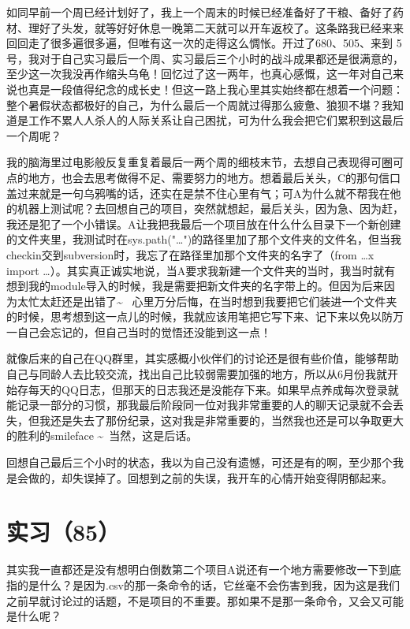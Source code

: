\documentclass[12pt]{book}
\begin{document}
如同早前一个周已经计划好了，我上一个周末的时候已经准备好了干粮、备好了药材、理好了头发，就等好好休息一晚第二天就可以开车返校了。这条路我已经来来回回走了很多遍很多遍，但唯有这一次的走得这么惆怅。开过了680、505、来到 5 号，我对于自己实习最后一个周、实习最后三个小时的战斗成果都还是很满意的，至少这一次我没再作缩头乌龟！回忆过了这一两年，也真心感慨，这一年对自己来说也真是一段值得纪念的成长史！但这一路上我心里其实始终都在想着一个问题：整个暑假状态都极好的自己，为什么最后一个周就过得那么疲惫、狼狈不堪？我知道是工作不累人人杀人的人际关系让自己困扰，可为什么我会把它们累积到这最后一个周呢？

我的脑海里过电影般反复重复着最后一两个周的细枝末节，去想自己表现得可圈可点的地方，也会去思考做得不足、需要努力的地方。想着最后关头，C的那句信口盖过来就是一句乌鸦嘴的话，还实在是禁不住心里有气；可A为什么就不帮我在他的机器上测试呢？去回想自己的项目，突然就想起，最后关头，因为急、因为赶，我还是犯了一个小错误。A让我把我最后一个项目放在什么什么目录下一个新创建的文件夹里，我测试时在sys.path("…")的路径里加了那个文件夹的文件名，但当我checkin交到subversion时，我忘了在路径里加那个文件夹的名字了（from …x import …）。其实真正诚实地说，当A要求我新建一个文件夹的当时，我当时就有想到我的module导入的时候，我是需要把新文件夹的名字带上的。但因为后来因为太忙太赶还是出错了\textasciitilde{}~ 心里万分后悔，在当时想到我要把它们装进一个文件夹的时候，思考想到这一点儿的时候，我就应该用笔把它写下来、记下来以免以防万一自己会忘记的，但自己当时的觉悟还没能到这一点！

就像后来的自己在QQ群里，其实感概小伙伴们的讨论还是很有些价值，能够帮助自己与同龄人去比较交流，找出自己比较弱需要加强的地方，所以从6月份我就开始存每天的QQ日志，但那天的日志我还是没能存下来。如果早点养成每次登录就能记录一部分的习惯，那我最后阶段同一位对我非常重要的人的聊天记录就不会丢失，但我还是失去了那份纪录，这对我是非常重要的，当然我也还是可以争取更大的胜利的smileface  \textasciitilde{}~当然，这是后话。

回想自己最后三个小时的状态，我以为自己没有遗憾，可还是有的啊，至少那个我是会做的，却失误掉了。回想到之前的失误，我开车的心情开始变得阴郁起来。


\section{实习（85）　}
\label{sec-5-88}

其实我一直都还是没有想明白倒数第二个项目A说还有一个地方需要修改一下到底指的是什么？是因为.csv的那一条命令的话，它丝毫不会伤害到我，因为这是我们之前早就讨论过的话题，不是项目的不重要。那如果不是那一条命令，又会又可能是什么呢？
\end{document}

